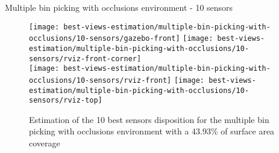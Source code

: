 Multiple bin picking with occlusions environment - 10 sensors

\begin{figure}
	\centering
	\texttt{[image: best-views-estimation/multiple-bin-picking-with-occlusions/10-sensors/gazebo-front]}\hspace{2em}
	\texttt{[image: best-views-estimation/multiple-bin-picking-with-occlusions/10-sensors/rviz-front-corner]}\\
	\texttt{[image: best-views-estimation/multiple-bin-picking-with-occlusions/10-sensors/rviz-front]}\hspace{1.5em}
	\texttt{[image: best-views-estimation/multiple-bin-picking-with-occlusions/10-sensors/rviz-top]}
	\caption{Estimation of the 10 best sensors disposition for the multiple bin picking with occlusions environment with a 43.93\% of surface area coverage}
\end{figure}
